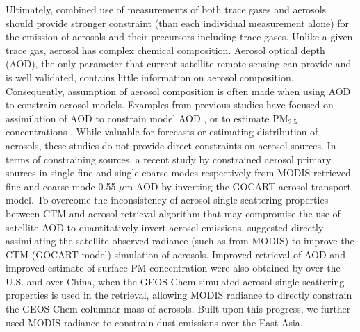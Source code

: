 Ultimately, combined use of measurements of both trace gases and aerosols 
should provide stronger constraint (than each individual measurement alone) for
the emission of aerosols and their precursors including trace gases. Unlike a
given trace gas, aerosol has complex chemical composition. Aerosol optical
depth (AOD), the only parameter that current satellite remote sensing can
provide and is well validated, contains little information on aerosol
composition. Consequently, assumption of aerosol composition is often made when
using AOD to constrain aerosol models. Examples from previous studies have
focused on assimilation of AOD to constrain model AOD \citep{Wang04,
Zhang08, Benedetti09}, or to estimate PM$_{2.5}$ concentrations
\citep{vanDonkelaar08}. While valuable for forecasts or estimating
distribution of aerosols, these studies do not provide direct constraints on
aerosol sources. In terms of constraining sources, a recent study by
\citep{Dubovik08} constrained aerosol primary sources in single-fine and 
single-coarse modes respectively from MODIS retrieved fine and coarse mode 
0.55 $\mu$m AOD by inverting the GOCART aerosol transport model. To overcome 
the inconsistency of aerosol single scattering properties between CTM and 
aerosol retrieval algorithm that may compromise the use of satellite AOD to 
quantitatively invert aerosol emissions, \citet{Weaver07} suggested directly
assimilating the satellite observed radiance (such as from MODIS) to improve
the CTM (GOCART model) simulation of aerosols. Improved retrieval of AOD and
improved estimate of surface PM concentration were also obtained by
\citet{Drury08} over the U.S. and \citet{Wang10} over China, when the 
GEOS-Chem simulated aerosol single scattering properties is used in the 
retrieval, allowing MODIS radiance to directly constrain the GEOS-Chem 
columnar mass of aerosols. Built upon this progress, we \citep{Wang12} 
further used MODIS radiance to constrain dust emissions over the East Asia.

